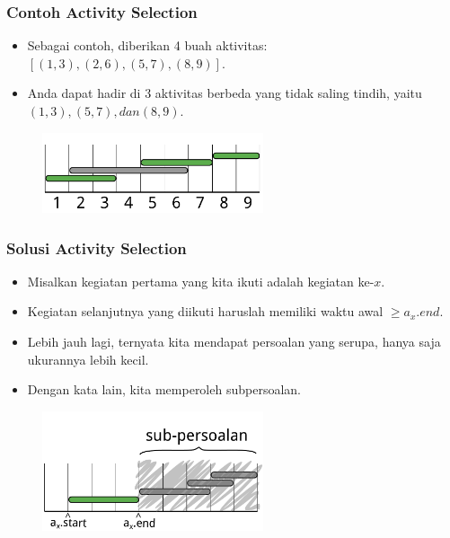 \begin{frame}
  \frametitle{Contoh Activity Selection}
  \begin{itemize}
    \item Sebagai contoh, diberikan 4 buah aktivitas: $[ (1, 3) , (2, 6), (5, 7),  (8, 9) ]$. \item Anda dapat hadir di 3 aktivitas berbeda yang tidak saling tindih, yaitu $(1, 3), (5, 7), dan (8, 9)$.
  \end{itemize}

  \begin{figure}
    \includegraphics[width=6.5cm]{asset/activity-selection.pdf}
  \end{figure}
\end{frame}

\begin{frame}
  \frametitle{Solusi Activity Selection}
  \begin{itemize}
    \item Misalkan kegiatan pertama yang kita ikuti adalah kegiatan ke-$x$.
    \item Kegiatan selanjutnya yang diikuti haruslah memiliki waktu awal $\geq a_x.end$.
    \item Lebih jauh lagi, ternyata kita mendapat persoalan yang serupa, hanya saja ukurannya lebih kecil.
    \item Dengan kata lain, kita memperoleh subpersoalan.
  \end{itemize}

  \begin{figure}
    \includegraphics[width=6.5cm]{asset/activity-selection-subproblem.pdf}
  \end{figure}
\end{frame}

